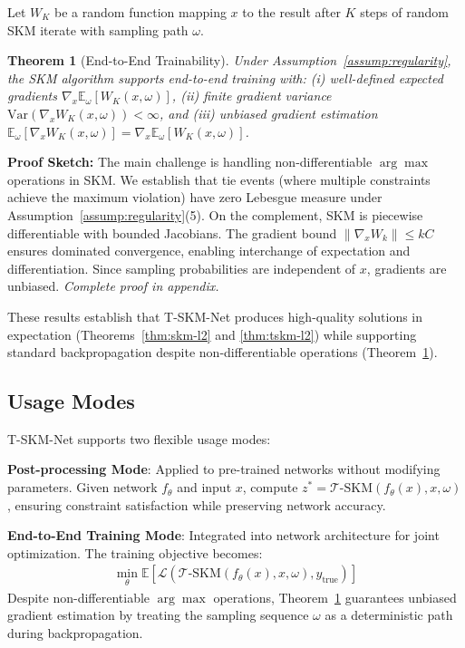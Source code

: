 \documentclass[letterpaper]{article} %
\newtheorem{theorem}{Theorem}
\begin{document}
Let $W_K$ be a random function mapping $x$ to the result after $K$ steps of random SKM iterate with sampling path $\omega$.

\begin{theorem}[End-to-End Trainability]
\label{thm:trainability}
Under Assumption~\ref{assump:regularity}, the SKM algorithm supports end-to-end training with: (i) well-defined expected gradients $\nabla_x \mathbb{E}_\omega[W_K(x,\omega)]$, (ii) finite gradient variance $\text{Var}(\nabla_x W_K(x,\omega)) < \infty$, and (iii) unbiased gradient estimation $\mathbb{E}_\omega[\nabla_x W_K(x,\omega)] = \nabla_x \mathbb{E}_\omega[W_K(x,\omega)]$.
\end{theorem}

\textbf{Proof Sketch:} The main challenge is handling non-differentiable $\arg\max$ operations in SKM. We establish that tie events (where multiple constraints achieve the maximum violation) have zero Lebesgue measure under Assumption~\ref{assump:regularity}(5). On the complement, SKM is piecewise differentiable with bounded Jacobians. The gradient bound $\|\nabla_x W_k\| \leq kC$ ensures dominated convergence, enabling interchange of expectation and differentiation. Since sampling probabilities are independent of $x$, gradients are unbiased. \textit{Complete proof in appendix.}

These results establish that T-SKM-Net produces high-quality solutions in expectation (Theorems~\ref{thm:skm-l2} and \ref{thm:tskm-l2}) while supporting standard backpropagation despite non-differentiable operations (Theorem~\ref{thm:trainability}).

\subsection{Usage Modes}

T-SKM-Net supports two flexible usage modes:

\textbf{Post-processing Mode}: Applied to pre-trained networks without modifying parameters. Given network $f_\theta$ and input $x$, compute $z^* = \mathcal{T}\text{-SKM}(f_\theta(x), x, \omega)$, ensuring constraint satisfaction while preserving network accuracy.

\textbf{End-to-End Training Mode}: Integrated into network architecture for joint optimization. The training objective becomes:
\begin{align}
\min_\theta \mathbb{E}[\mathcal{L}(\mathcal{T}\text{-SKM}(f_\theta(x), x, \omega), y_{\text{true}})]
\end{align}
Despite non-differentiable $\arg\max$ operations, Theorem~\ref{thm:trainability} guarantees unbiased gradient estimation by treating the sampling sequence $\omega$ as a deterministic path during backpropagation.
\end{document}
